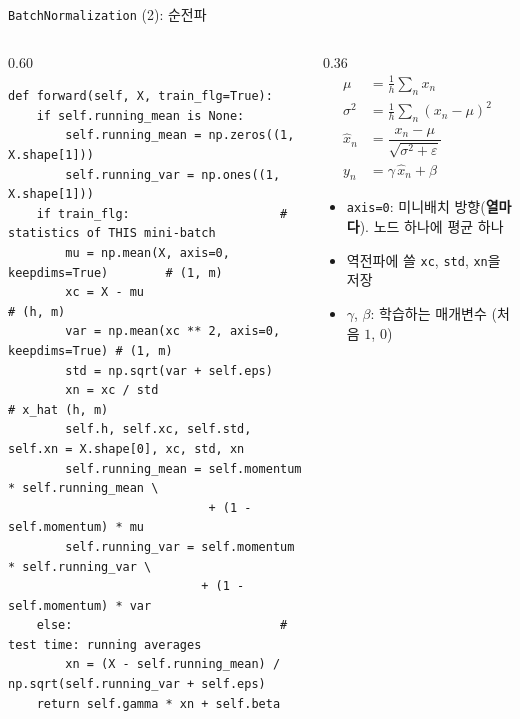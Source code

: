 \documentclass[aspectratio=169,11pt]{beamer}
\newcommand{\codetiny}{\ttfamily\fontsize{6.8}{7.6}\selectfont}
\newcommand{\code}[1]{\texttt{#1}}
\begin{document}
\begin{frame}[fragile]{\code{BatchNormalization} (2): 순전파}
\begin{columns}[T,onlytextwidth]
\begin{column}{0.60\textwidth}
\begin{lstlisting}[basicstyle=\codetiny]
def forward(self, X, train_flg=True):
    if self.running_mean is None:
        self.running_mean = np.zeros((1, X.shape[1]))
        self.running_var = np.ones((1, X.shape[1]))
    if train_flg:                     # statistics of THIS mini-batch
        mu = np.mean(X, axis=0, keepdims=True)        # (1, m)
        xc = X - mu                                   # (h, m)
        var = np.mean(xc ** 2, axis=0, keepdims=True) # (1, m)
        std = np.sqrt(var + self.eps)
        xn = xc / std                                 # x_hat (h, m)
        self.h, self.xc, self.std, self.xn = X.shape[0], xc, std, xn
        self.running_mean = self.momentum * self.running_mean \
                            + (1 - self.momentum) * mu
        self.running_var = self.momentum * self.running_var \
                           + (1 - self.momentum) * var
    else:                             # test time: running averages
        xn = (X - self.running_mean) / np.sqrt(self.running_var + self.eps)
    return self.gamma * xn + self.beta
\end{lstlisting}
\end{column}
\begin{column}{0.36\textwidth}
\small
\[
\begin{aligned}
\mu &= \tfrac1h\textstyle\sum_n x_n\\
\sigma^2 &= \tfrac1h\textstyle\sum_n (x_n-\mu)^2\\
\hat x_n &= \dfrac{x_n-\mu}{\sqrt{\sigma^2+\varepsilon}}\\
y_n &= \gamma\,\hat x_n+\beta
\end{aligned}
\]
\begin{itemize}
\item \code{axis=0}: 미니배치 방향(\textbf{열마다}). 노드 하나에 평균 하나
\item 역전파에 쓸 \code{xc}, \code{std}, \code{xn}을 저장
\item $\gamma$, $\beta$: 학습하는 매개변수 (처음 $1$, $0$)
\end{itemize}
\end{column}
\end{columns}
\end{frame}
\end{document}
